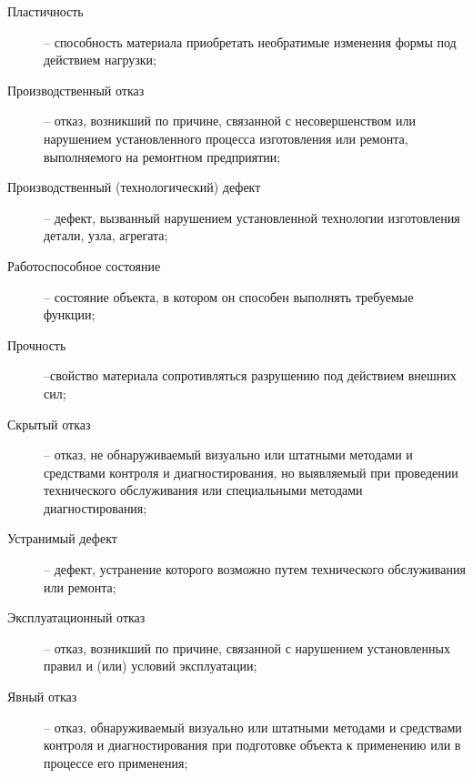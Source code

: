 \begin{description}
\item
[Пластичность] --  способность  материала
приобретать  необратимые  изменения  формы  под действием нагрузки;
\item
[Производственный отказ] -- отказ, возникший по причине, связанной с несовершенством или нарушением установленного процесса изготовления или ремонта, выполняемого на ремонтном предприятии;
\item
[Производственный (технологический) дефект] -- дефект, вызванный нарушением установленной технологии изготовления детали, узла, агрегата;
\item
[Работоспособное состояние] -- состояние объекта, в котором он способен выполнять требуемые функции;
\item
[Прочность] --свойство материала сопротивляться разрушению под действием внешних сил;
\item
[Скрытый отказ] -- отказ, не обнаруживаемый визуально или штатными методами и средствами контроля и диагностирования, но выявляемый при проведении технического обслуживания или специальными методами диагностирования;
\item
[Устранимый дефект] -- дефект, устранение которого возможно путем технического  обслуживания или ремонта;
\item
[Эксплуатационный отказ] -- отказ, возникший по причине, связанной с нарушением установленных правил и (или) условий эксплуатации;
\item
[Явный отказ] -- отказ, обнаруживаемый визуально или штатными методами и средствами контроля и диагностирования при подготовке объекта к применению или в процессе его применения;


\end{description}
